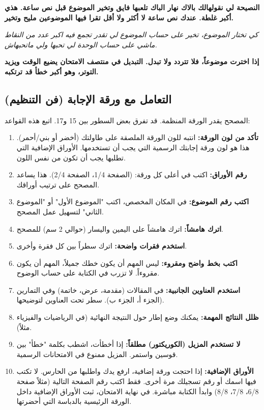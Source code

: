 \documentclass[12pt,a4paper]{book}
\newcommand{\quoteAr}[1]{%
	\begin{myquote}
		\itshape #1
	\end{myquote}
}
\newcommand{\importantAr}[1]{%
	\begin{important}
		\bfseries #1
	\end{important}
}
\begin{document}
	\importantAr{النصيحة لي نقولهالك بالاك نهار الباك تلعبها فايق وتخير الموضوع قبل نص ساعة. هذي أكبر غلطة. عندك نص ساعة لا أكثر ولا أقل تقرا فيها الموضوعين مليح وتخير.}
	
	\quoteAr{كي تختار الموضوع، تخير على حساب الموضوع لي تقدر تجمع فيه اكبر عدد من النقاط ماشي على حساب الوحدة لي تحبها ولي ماتحبهاش.}
	
	\importantAr{إذا اخترت موضوعاً، فلا تتردد ولا تبدل. التبديل في منتصف الامتحان يضيع الوقت ويزيد التوتر، وهو أكبر خطأ قد ترتكبه.}
	
	\subsection{التعامل مع ورقة الإجابة (فن التنظيم)}
	المصحح يقدر الورقة المنظمة. قد تفرق بعض السطور بين 15 و17. اتبع هذه القواعد:
	
	\begin{enumerate}
		\item \textbf{تأكد من لون الورقة:} انتبه للون الورقة الملصقة على طاولتك (أخضر أو بني/أحمر). هذا هو لون ورقة إجابتك الرسمية التي يجب أن تستخدمها. الأوراق الإضافية التي تطلبها يجب أن تكون من نفس اللون.
		\item \textbf{رقم الأوراق:} اكتب في أعلى كل ورقة: (الصفحة 1/4، الصفحة 2/4). هذا يساعد المصحح على ترتيب أوراقك.
		\item \textbf{اكتب رقم الموضوع:} في المكان المخصص، اكتب "الموضوع الأول" أو "الموضوع الثاني" لتسهيل عمل المصحح.
		\item \textbf{اترك هامشاً:} اترك هامشاً على اليمين واليسار (حوالي 2 سم) للمصحح.
		\item \textbf{استخدم فقرات واضحة:} اترك سطراً بين كل فقرة وأخرى.
		\item \textbf{اكتب بخط واضح ومقروء:} ليس المهم أن يكون خطك جميلاً، المهم أن يكون مقروءاً. لا تزرب في الكتابة على حساب الوضوح.
		\item \textbf{استخدم العناوين الجانبية:} في المقالات (مقدمة، عرض، خاتمة) وفي التمارين (الجزء أ، الجزء ب). سطر تحت العناوين لتوضيحها.
		\item \textbf{ظلل النتائج المهمة:} يمكنك وضع إطار حول النتيجة النهائية (في الرياضيات والفيزياء مثلاً).
		\item \textbf{لا تستخدم المزيل (الكوريكتور) مطلقاً:} إذا أخطأت، اشطب بكلمة "خطأ" بين قوسين واستمر. المزيل ممنوع في الامتحانات الرسمية.
		\item \textbf{الأوراق الإضافية:} إذا احتجت ورقة إضافية، ارفع يدك واطلبها من الحارس. لا تكتب فيها اسمك أو رقم تسجيلك مرة أخرى. فقط اكتب رقم الصفحة التالية (مثلاً صفحة 6/8، 7/8، 8/8) وابدأ الكتابة مباشرة. في نهاية الامتحان، ثبت الأوراق الإضافية داخل الورقة الرئيسية بالدباسة التي أحضرتها.
	\end{enumerate}
	
\end{document}

